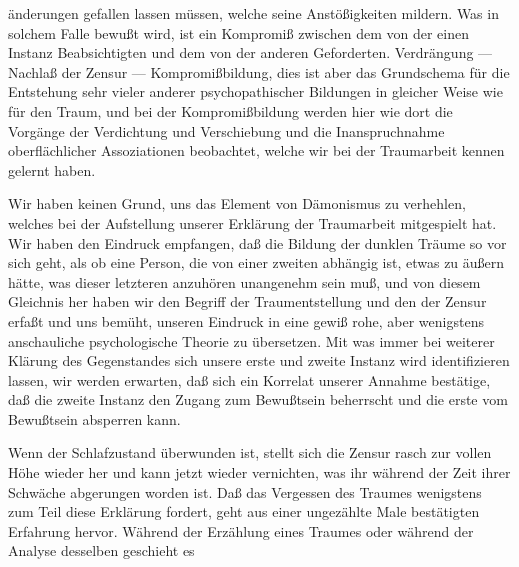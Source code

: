 \documentclass[twoside=true,titlepage=false,open=any, parskip=never, fontsize=10pt, headings=small, chapterprefix=false, appendixprefix=false]{scrbook}
\begin{document}
         
            
            
            
        \pstart
        änderungen gefallen lassen müssen, welche seine Anstößigkeiten
               mildern. Was in solchem Falle bewußt wird, ist ein Kompromiß zwischen dem von
               der einen Instanz Beabsichtigten und dem von der anderen Geforderten. Verdrängung — Nachlaß der Zensur — Kompromißbildung,
               dies ist aber das Grundschema für die Entstehung sehr vieler anderer
               psychopathischer Bildungen in gleicher Weise wie für den Traum, und bei der
               Kompromißbildung werden hier wie dort die Vorgänge der Verdichtung
               und Verschiebung und die Inanspruchnahme oberflächlicher
               Assoziationen beobachtet, welche wir bei der Traumarbeit kennen gelernt
               haben.
        \pend
    
            
        \pstart
        Wir haben keinen Grund, uns das Element von Dämonismus zu verhehlen, welches bei
               der Aufstellung unserer Erklärung der Traumarbeit mitgespielt hat. Wir haben den
               Eindruck empfangen, daß die Bildung der dunklen Träume so vor sich geht, als ob eine Person, die von einer zweiten
               abhängig ist, etwas zu äußern hätte, was dieser letzteren anzuhören unangenehm
               sein muß, und von diesem Gleichnis her haben wir den Begriff der Traumentstellung und den der Zensur erfaßt und uns bemüht, unseren Eindruck
               in eine gewiß rohe, aber wenigstens anschauliche psychologische
               Theorie zu übersetzen. Mit was immer bei weiterer Klärung des Gegenstandes sich
               unsere erste und zweite Instanz wird identifizieren lassen, wir werden erwarten,
               daß sich ein Korrelat unserer Annahme bestätige, daß die zweite Instanz den
               Zugang zum Bewußtsein beherrscht und die erste vom Bewußtsein absperren
               kann.
        \pend
    
            
        \pstart
        Wenn der Schlafzustand überwunden ist, stellt sich die Zensur rasch zur vollen
               Höhe wieder her und kann jetzt wieder vernichten, was ihr während der
               Zeit ihrer Schwäche abgerungen worden ist. Daß das Vergessen des Traumes wenigstens zum Teil
               diese Erklärung fordert, geht aus einer ungezählte Male bestätigten Erfahrung
               hervor. Während der Erzählung eines Traumes oder während der Analyse desselben
               geschieht es
            
\end{document}
